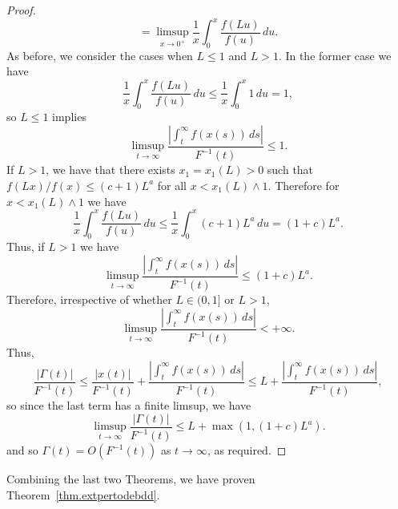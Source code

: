 \documentclass[a4paper,10pt,reqno]{amsart}
\numberwithin{equation}{section}
\theoremstyle{definition}
\theoremstyle{remark}
\DeclareMathOperator{\1}{\mathbbm 1}
\begin{document}
\begin{proof}
\[		=\limsup_{x\to 0^+} \frac{1}{x}\int_0^x \frac{f(Lu)}{f(u)}\,du.	
		\]
		As before, we consider the cases when $L\leq 1$ and $L>1$. In the former case
		we have 
		\[
		\frac{1}{x}\int_0^x \frac{f(Lu)}{f(u)}\,du\leq \frac{1}{x}\int_0^x 1\,du =1,
		\]
		so $L\leq 1$ implies 
		\[
		\limsup_{t \to \infty} \frac{\left|\int_t^\infty f(x(s))\, ds \right|}{F^{-1}(t)}\leq 1.
		\]
		If $L>1$, we have that there exists $x_1=x_1(L)>0$ such that $f(Lx)/f(x)\leq (c+1)L^a$ for all $x<x_1(L)\wedge 1$. Therefore for $x<x_1(L)\wedge 1$ we have
		\[
		\frac{1}{x}\int_0^x \frac{f(Lu)}{f(u)}\,du \leq \frac{1}{x}\int_0^x (c+1)L^a\,du = (1+c)L^a.
		\]
		Thus, if $L>1$ we have 
		\[
		\limsup_{t \to \infty} \frac{\left|\int_t^\infty f(x(s))\, ds \right|}{F^{-1}(t)}\leq (1+c)L^a.
		\]
		Therefore, irrespective of whether $L \in (0,1]$ or $L > 1$,
		\[
		\limsup_{t \to \infty} \frac{\left| \int_t^\infty f(x(s)) \, ds \right|}{F^{-1}(t)} < +\infty.
		\]
		Thus,
		\[
		\frac{|\Gamma(t)|}{F^{-1}(t)} \leq \frac{|x(t)|}{F^{-1}(t)} + \frac{\left| \int_t^\infty f(x(s)) \, ds \right|}{F^{-1}(t)}
		\leq L+\frac{\left| \int_t^\infty f(x(s)) \, ds \right|}{F^{-1}(t)},
		\]
		so since the last term has a finite limsup, we have 
		\[
		\limsup_{t \to \infty} \frac{|\Gamma(t)|}{F^{-1}(t)} \leq L+\max(1,(1+c)L^a).
		\]
		and so $\Gamma(t)=O(F^{-1}(t))$ as $t\to\infty$, as required.
	\end{proof}
	Combining the last two Theorems, we have proven Theorem~\ref{thm.extpertodebdd}.
	
\end{document}

